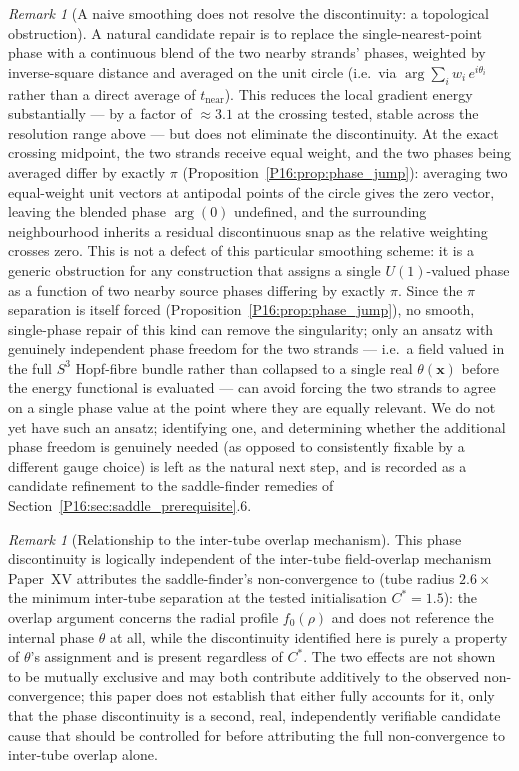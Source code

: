 \documentclass[11pt,a4paper]{article}
\theoremstyle{definition}\newtheorem{definition}[theorem]{Definition}
\theoremstyle{remark}
\newtheorem{remark}[theorem]{Remark}
\theoremstyle{definition}\newtheorem{construction}[theorem]{Construction}
\begin{document}
\begin{remark}[A naive smoothing does not resolve the discontinuity:
  a topological obstruction]
\label{P16:rem:naive_smoothing_fails}
A natural candidate repair is to replace the single-nearest-point
phase with a continuous blend of the two nearby strands' phases,
weighted by inverse-square distance and averaged on the unit circle
(i.e.\ via $\arg\sum_i w_i\,e^{i\theta_i}$ rather than a direct
average of $t_{\mathrm{near}}$). This reduces the local gradient
energy substantially --- by a factor of $\approx3.1$ at the crossing
tested, stable across the resolution range above --- but does not
eliminate the discontinuity. At the exact crossing midpoint, the two
strands receive equal weight, and the two phases being averaged
differ by exactly $\pi$ (Proposition~\ref{P16:prop:phase_jump}): averaging
two equal-weight unit vectors at antipodal points of the circle gives
the zero vector, leaving the blended phase $\arg(0)$ undefined, and
the surrounding neighbourhood inherits a residual discontinuous snap
as the relative weighting crosses zero. This is not a defect of this
particular smoothing scheme: it is a generic obstruction for any
construction that assigns a single $U(1)$-valued phase as a function
of two nearby source phases differing by exactly $\pi$. Since the
$\pi$ separation is itself forced (Proposition~\ref{P16:prop:phase_jump}),
no smooth, single-phase repair of this kind can remove the
singularity; only an ansatz with genuinely independent phase
freedom for the two strands --- i.e.\ a field valued in the full
$S^3$ Hopf-fibre bundle rather than collapsed to a single real
$\theta(\mathbf{x})$ before the energy functional is evaluated ---
can avoid forcing the two strands to agree on a single phase value at
the point where they are equally relevant. We do not yet have such an
ansatz; identifying one, and determining whether the additional
phase freedom is genuinely needed (as opposed to consistently
fixable by a different gauge choice) is left as the natural next step,
and is recorded as a candidate refinement to the saddle-finder
remedies of Section~\ref{P16:sec:saddle_prerequisite}.6.
\end{remark}

\begin{remark}[Relationship to the inter-tube overlap mechanism]
\label{P16:rem:two_mechanisms}
This phase discontinuity is logically independent of the inter-tube
field-overlap mechanism Paper~XV attributes the saddle-finder's
non-convergence to (tube radius $2.6\times$ the minimum inter-tube
separation at the tested initialisation $C^*=1.5$): the overlap
argument concerns the radial profile $f_0(\rho)$ and does not
reference the internal phase $\theta$ at all, while the discontinuity
identified here is purely a property of $\theta$'s assignment and is
present regardless of $C^*$. The two effects are not shown to be
mutually exclusive and may both contribute additively to the observed
non-convergence; this paper does not establish that either fully
accounts for it, only that the phase discontinuity is a second, real,
independently verifiable candidate cause that should be controlled
for before attributing the full non-convergence to inter-tube overlap
alone.
\end{remark}
\end{document}
